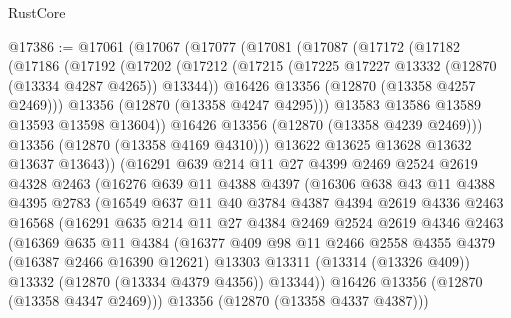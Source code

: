 \begin{lexlean}{RustCore}
\begin{coremodule}
@17386 := @17061
    (@17067
      (@17077
        (@17081
          (@17087
            (@17172
              (@17182
                (@17186
                  (@17192
                    (@17202
                      (@17212
                        (@17215 (@17225 @17227 @13332 (@12870 (@13334 @4287 @4265)) @13344))
                        @16426
                        @13356
                        (@12870 (@13358 @4257 @2469)))
                      @13356
                      (@12870 (@13358 @4247 @4295)))
                    @13583
                    @13586
                    @13589
                    @13593
                    @13598
                    @13604))
                @16426
                @13356
                (@12870 (@13358 @4239 @2469)))
              @13356
              (@12870 (@13358 @4169 @4310)))
            @13622
            @13625
            @13628
            @13632
            @13637
            @13643))
        (@16291
          @639
          @214
          @11
          @27
          @4399
          @2469
          @2524
          @2619
          @4328
          @2463
          (@16276
            @639
            @11
            @4388
            @4397
            (@16306
              @638
              @43
              @11
              @4388
              @4395
              @2783
              (@16549
                @637
                @11
                @40
                @3784
                @4387
                @4394
                @2619
                @4336
                @2463
                @16568
                (@16291
                  @635
                  @214
                  @11
                  @27
                  @4384
                  @2469
                  @2524
                  @2619
                  @4346
                  @2463
                  (@16369
                    @635
                    @11
                    @4384
                    (@16377
                      @409
                      @98
                      @11
                      @2466
                      @2558
                      @4355
                      @4379
                      (@16387 @2466 @16390 @12621)
                      @13303
                      @13311
                      (@13314 (@13326 @409))
                      @13332
                      (@12870 (@13334 @4379 @4356))
                      @13344))
                  @16426
                  @13356
                  (@12870 (@13358 @4347 @2469)))
                @13356
                (@12870 (@13358 @4337 @4387)))

\end{coremodule}
\end{lexlean}
